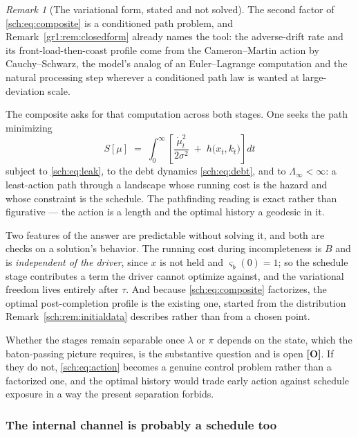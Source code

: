 \documentclass[11pt]{article}
\numberwithin{equation}{section}
\theoremstyle{plain}
\theoremstyle{definition}
\theoremstyle{remark}
\newtheorem{remark}[theorem]{Remark}
\begin{document}
\begin{remark}[The variational form, stated and not solved]
\label{sch:rem:variational}
The second factor of \eqref{sch:eq:composite} is a conditioned path
problem, and Remark~\ref{gr1:rem:closedform} already names the tool: the
adverse-drift rate and its front-load-then-coast profile come from the
Cameron--Martin action by Cauchy--Schwarz, the model's analog of an
Euler--Lagrange computation and the natural processing step wherever a
conditioned path law is wanted at large-deviation scale.

The composite asks for that computation across both stages. One seeks
the path minimizing
\begin{equation}\label{sch:eq:action}
S[\mu]\;=\;\int_0^{\infty}\left[\frac{\dot\mu_t^{2}}{2\sigma^{2}}
\;+\;h\bigl(x_t,k_t\bigr)\right]dt
\end{equation}
subject to \eqref{sch:eq:leak}, to the debt dynamics
\eqref{sch:eq:debt}, and to $\Lambda_\infty<\infty$: a least-action path
through a landscape whose running cost is the hazard and whose
constraint is the schedule. The pathfinding reading is exact rather than
figurative --- the action is a length and the optimal history a geodesic
in it.

Two features of the answer are predictable without solving it, and both
are checks on a solution's behavior. The running cost during
incompleteness is $B$ and is \emph{independent of the driver}, since $x$
is not held and $\varsigma_b(0)=1$; so the schedule stage contributes a
term the driver cannot optimize against, and the variational freedom
lives entirely after $\tau$. And because \eqref{sch:eq:composite}
factorizes, the optimal post-completion profile is the existing one,
started from the distribution Remark~\ref{sch:rem:initialdata}
describes rather than from a chosen point.

Whether the stages remain separable once $\lambda$ or $\pi$ depends on
the state, which the baton-passing picture requires, is the
substantive question and is open \textbf{[O]}. If they do not,
\eqref{sch:eq:action} becomes a genuine control problem rather than a
factorized one, and the optimal history would trade early action against
schedule exposure in a way the present separation forbids.
\end{remark}

\subsubsection{The internal channel is probably a schedule too}
\label{sch:subsub:internalschedule}
\end{document}
